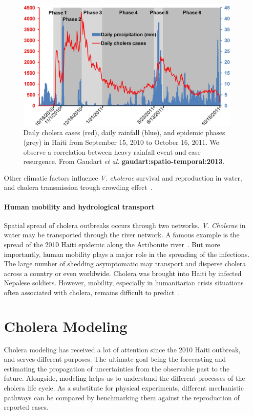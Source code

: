 \begin{figure}
\centering
\includegraphics[width=.7\textwidth]{fig/cholera-rainfall.png}
\caption{Daily cholera cases (red), daily rainfall (blue), and epidemic phases (grey) in Haiti from September 15, 2010 to October
16, 2011. We observe a correlation between heavy rainfall event and case resurgence. From Gaudart \textit{et al.} \textbf{gaudart:spatio-temporal:2013}.}
\label{rain}
\end{figure}

Other climatic factors influence \textit{V. cholerae} survival and reproduction in water, and cholera transmission trough crowding effect~\cite{koelle_refractory_2005}.

\paragraph{Human mobility and hydrological transport} Spatial spread of cholera outbreaks occurs through two networks. \textit{V. Cholerae} in water may be transported through the river network. A famous example is the spread of the 2010 Haiti epidemic along the Artibonite river~\cite{gaudart_spatio-temporal_2013}. But more importantly, human mobility plays a major role in the spreading of the infections. The large number of shedding asymptomatic may transport and disperse cholera across a country or even worldwide.  Cholera was brought into Haiti by infected Nepalese soldiers. However, mobility, especially in humanitarian crisis situations often associated with cholera, remains difficult to predict~\cite{lu_predictability_2012, riley_large-scale_2007, bengtsson_improved_2011, rebaudet_dry_2013}.

\section{Cholera Modeling}
Cholera modeling has received a lot of attention since the 2010 Haiti outbreak, and serves different purposes. The ultimate goal being  the forecasting and estimating the propagation of uncertainties from the observable past to the future. Alongside, modeling helps us to understand the different processes of the cholera life cycle. As a substitute for physical experiments, different mechanistic pathways can be compared by benchmarking them against the reproduction of reported cases. %

